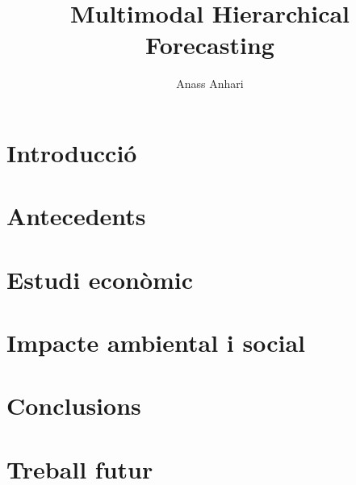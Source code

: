 \documentclass{tfgitic}[2024/07/01]
\title{Multimodal Hierarchical Forecasting}
\author{Anass Anhari}
\begin{document}

\chapter{Introducció}
\chapter{Antecedents}


\chapter{Estudi econòmic}
\chapter{Impacte ambiental i social}
\chapter{Conclusions}
\chapter{Treball futur}


\printbibliography

\end{document}
